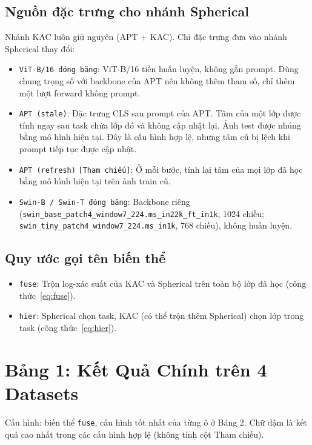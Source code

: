 \documentclass[10pt,a4paper]{article}
\newcommand{\src}[1]{\texttt{[#1]}}
\begin{document}
\subsection{Nguồn đặc trưng cho nhánh Spherical}
Nhánh KAC luôn giữ nguyên (APT + KAC). Chỉ đặc trưng đưa vào nhánh Spherical thay đổi:
\begin{itemize}
  \item \texttt{ViT-B/16 đóng băng}: ViT-B/16 tiền huấn luyện, không gắn prompt. Dùng chung trọng số với backbone của APT nên không thêm tham số, chỉ thêm một lượt forward không prompt.
  \item \texttt{APT (stale)}: Đặc trưng CLS sau prompt của APT. Tâm của một lớp được tính ngay sau task chứa lớp đó và không cập nhật lại. Ảnh test được nhúng bằng mô hình hiện tại. Đây là cấu hình hợp lệ, nhưng tâm cũ bị lệch khi prompt tiếp tục được cập nhật.
  \item \texttt{APT (refresh)} \src{Tham chiếu}: Ở mỗi bước, tính lại tâm của mọi lớp đã học bằng mô hình hiện tại trên ảnh train cũ.
  \item \texttt{Swin-B / Swin-T đóng băng}: Backbone riêng (\texttt{swin\_base\_patch4\_window7\_224.ms\_in22k\_ft\_in1k}, 1024 chiều; \texttt{swin\_tiny\_patch4\_window7\_224.ms\_in1k}, 768 chiều), không huấn luyện.
\end{itemize}

\subsection{Quy ước gọi tên biến thể}
\begin{itemize}
  \item \texttt{fuse}: Trộn log-xác suất của KAC và Spherical trên toàn bộ lớp đã học (công thức~\eqref{eq:fuse}).
  \item \texttt{hier}: Spherical chọn task, KAC (có thể trộn thêm Spherical) chọn lớp trong task (công thức~\eqref{eq:hier}).
\end{itemize}

\section{Bảng 1: Kết Quả Chính trên 4 Datasets}
Cấu hình: biến thể \texttt{fuse}, cấu hình tốt nhất của từng ô ở Bảng 2. Chữ đậm là kết quả cao nhất trong các cấu hình hợp lệ (không tính cột Tham chiếu).
\end{document}
